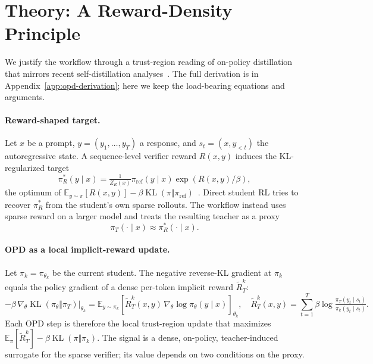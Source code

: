 \documentclass{article}
\begin{document}
\section{Theory: A Reward-Density Principle}
\label{sec:theory}

We justify the workflow through a trust-region reading of on-policy distillation that mirrors recent self-distillation analyses~\citep{shenfeld2026selfdistillation}. The full derivation is in Appendix~\ref{app:opd-derivation}; here we keep the load-bearing equations and arguments.

\paragraph{Reward-shaped target.} Let $x$ be a prompt, $y=(y_1,\ldots,y_T)$ a response, and $s_t=(x,y_{<t})$ the autoregressive state. A sequence-level verifier reward $R(x,y)$ induces the KL-regularized target
\begin{equation}
\pi_R^*(y\mid x)=\tfrac{1}{Z_R(x)}\pi_{\mathrm{ref}}(y\mid x)\exp(R(x,y)/\beta),
\label{eq:reward-shaped-target}
\end{equation}
the optimum of $\mathbb{E}_{y\sim\pi}[R(x,y)]-\beta\operatorname{KL}(\pi\Vert\pi_{\mathrm{ref}})$~\citep{rafailov2024direct,shenfeld2026selfdistillation}. Direct student RL tries to recover $\pi_R^*$ from the student's own sparse rollouts. The workflow instead uses sparse reward on a larger model and treats the resulting teacher as a proxy
\begin{equation}
\pi_T(\cdot\mid x)\approx \pi_R^*(\cdot\mid x).
\label{eq:teacher-proxy-assumption}
\end{equation}

\paragraph{OPD as a local implicit-reward update.} Let $\pi_k=\pi_{\theta_k}$ be the current student. The negative reverse-KL gradient at $\pi_k$ equals the policy gradient of a dense per-token implicit reward $\widetilde R_T^k$:
\begin{equation}
-\beta\,\nabla_\theta\operatorname{KL}(\pi_\theta\Vert\pi_T)\big|_{\theta_k} = \mathbb{E}_{y\sim\pi_k}\!\left[\widetilde R_T^k(x,y)\,\nabla_\theta\log\pi_\theta(y\mid x)\right]_{\theta_k},
\quad \widetilde R_T^k(x,y)=\sum_{t=1}^T\beta\log\tfrac{\pi_T(y_t\mid s_t)}{\pi_k(y_t\mid s_t)}.
\label{eq:opd-as-irl}
\end{equation}
Each OPD step is therefore the local trust-region update that maximizes $\mathbb{E}_\pi[\widetilde R_T^k] - \beta\operatorname{KL}(\pi\Vert\pi_k)$. The signal is a dense, on-policy, teacher-induced surrogate for the sparse verifier; its value depends on two conditions on the proxy.
\end{document}

